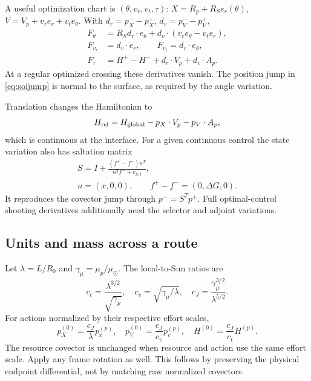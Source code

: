 A useful optimization chart is $(\theta,v_r,v_t,\tau)$:
$X=R_p+R_Se_r(\theta)$,
$V=V_p+v_re_r+v_te_\theta$.
With $d_r=p_X^- -p_X^+$, $d_v=p_V^- -p_V^+$,
\begin{equation}
 \begin{split}
 F_\theta&=R_Sd_r\cdot e_\theta
             +d_v\cdot(v_re_\theta-v_te_r),\\
 F_{v_r}&=d_v\cdot e_r,\qquad F_{v_t}=d_v\cdot e_\theta,\\
 F_\tau&=H^+-H^-+d_r\cdot V_p+d_v\cdot A_p.
 \end{split}
 \label{eq:soichart}
\end{equation}
At a regular optimized crossing these derivatives vanish.
The position jump in \eqref{eq:soijump} is normal to the surface, as
required by the angle variation.

Translation changes the Hamiltonian to
\begin{equation}
 H_{\rm rel}=H_{\rm global}-p_X\cdot V_p-p_V\cdot A_p,
\end{equation}
which is continuous at the interface. For a given continuous control
the state variation also has saltation matrix
\begin{equation}
 \begin{gathered}
 S=I+\frac{(f^+-f^-)n^T}{n^Tf^-+c_{S,t}},\\
 n=(x,0,0),\qquad f^+-f^-=(0,\Delta G,0).
 \end{gathered}
\end{equation}
It reproduces the covector jump through $p^-=S^Tp^+$.
Full optimal-control shooting derivatives additionally need the
selector and adjoint variations.

\subsection{Units and mass across a route}
Let $\lambda=L/R_0$ and $\gamma_\mu=\mu_p/\mu_\odot$.
The local-to-Sun ratios are
\begin{equation}
 c_t=\frac{\lambda^{3/2}}{\sqrt{\gamma_\mu}},\quad
 c_v=\sqrt{\gamma_\mu/\lambda},\quad
 c_J=\frac{\gamma_\mu^{3/2}}{\lambda^{5/2}}.
\end{equation}
For actions normalized by their respective effort scales,
\begin{equation}
 p_X^{(0)}=\frac{c_J}{\lambda}p_x^{(p)},\quad
 p_V^{(0)}=\frac{c_J}{c_v}p_v^{(p)},\quad
 H^{(0)}=\frac{c_J}{c_t}H^{(p)}.
 \label{eq:covscale}
\end{equation}
The resource covector is unchanged when resource and action use the
same effort scale. Apply any frame rotation as well.
This follows by preserving the physical endpoint differential, not
by matching raw normalized covectors.

